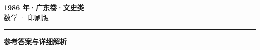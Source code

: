 \documentclass[zihao=5, a4paper]{ctexart}
\begin{document}
\begin{center}
  {\Large\bfseries 1986 年·广东卷·文史类}\\[4pt]
  {\large 数学 · 印刷版}
\end{center}
\medskip
{}

\par\bigskip\hrule\bigskip
{}
\begin{center}{\large\bfseries 参考答案与详细解析}\end{center}
\smallskip

\end{document}
